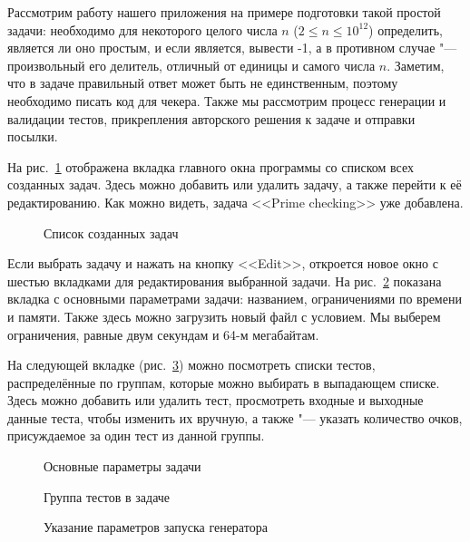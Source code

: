 Рассмотрим работу нашего приложения на примере подготовки такой простой задачи: необходимо для некоторого целого числа $n$ ($2 \leq n \leq 10^{12}$) определить, является ли оно простым, и если является, вывести -1, а в противном случае "--- произвольный его делитель, отличный от единицы и самого числа $n$. Заметим, что в задаче правильный ответ может быть не единственным, поэтому необходимо писать код для чекера. Также мы рассмотрим процесс генерации и валидации тестов, прикрепления авторского решения к задаче и отправки посылки.

На рис.~\ref{screen_problems} отображена вкладка главного окна программы со списком всех созданных задач. Здесь можно добавить или удалить задачу, а также перейти к её редактированию. Как можно видеть, задача <<Prime checking>> уже добавлена.

\begin{figure}[h]
\caption{Список созданных задач}
\label{screen_problems}
\end{figure}

Если выбрать задачу и нажать на кнопку <<Edit>>, откроется новое окно с шестью вкладками для редактирования выбранной задачи. На рис.~\ref{screen_problem_param} показана вкладка с основными параметрами задачи: названием, ограничениями по времени и памяти. Также здесь можно загрузить новый файл с условием. Мы выберем ограничения, равные двум секундам и 64-м мегабайтам.

На следующей вкладке (рис.~\ref{screen_tests}) можно посмотреть списки тестов, распределённые по группам, которые можно выбирать в выпадающем списке. Здесь можно добавить или удалить тест, просмотреть входные и выходные данные теста, чтобы изменить их вручную, а также "--- указать количество очков, присуждаемое за один тест из данной группы.

\begin{figure}[h]
\caption{Основные параметры задачи}
\label{screen_problem_param}
\end{figure}

\begin{figure}[h]
\caption{Группа тестов в задаче}
\label{screen_tests}
\end{figure}

\begin{figure}[!ht]
\caption{Указание параметров запуска генератора}
\label{screen_generators}
\end{figure}

